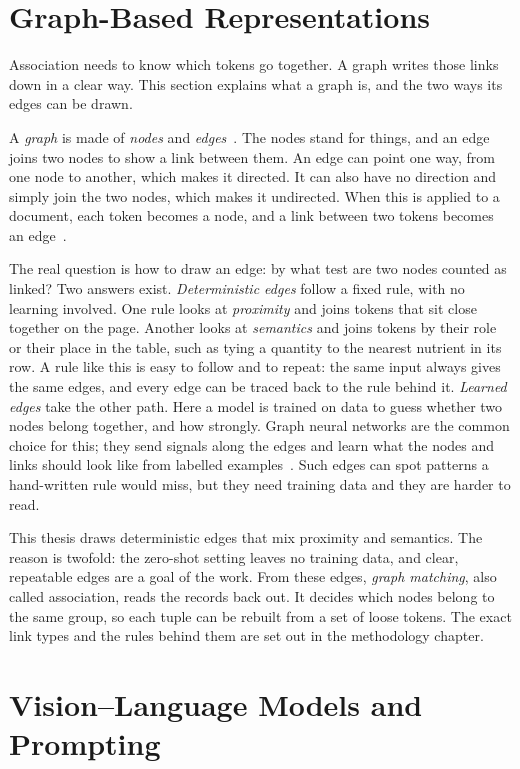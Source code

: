 \section{Graph-Based Representations}\label{sec:bgd-graphs}

Association needs to know which tokens go together. A graph writes those links
down in a clear way. This section explains what a graph is, and the two ways its
edges can be drawn.

A \emph{graph} is made of \emph{nodes} and \emph{edges}~\cite{west2001graph}. The
nodes stand for things, and an edge joins two nodes to show a link between them. An
edge can point one way, from one node to another, which makes it directed. It can
also have no direction and simply join the two nodes, which makes it undirected.
When this is applied to a document, each token becomes a node, and a link between
two tokens becomes an edge~\cite{liu2019vrd}.

The real question is how to draw an edge: by what test are two nodes counted as
linked? Two answers exist. \emph{Deterministic edges} follow a fixed rule, with no
learning involved. One rule looks at \emph{proximity} and joins tokens that sit
close together on the page. Another looks at \emph{semantics} and joins tokens by
their role or their place in the table, such as tying a quantity to the nearest
nutrient in its row. A rule like this is easy to follow and to repeat: the same
input always gives the same edges, and every edge can be traced back to the rule
behind it. \emph{Learned edges} take the other path. Here a model is trained on
data to guess whether two nodes belong together, and how strongly. Graph neural
networks are the common choice for this; they send signals along the edges and
learn what the nodes and links should look like from labelled
examples~\cite{scarselli2009gnn, kipf2017gcn}. Such edges can spot patterns a
hand-written rule would miss, but they need training data and they are harder to
read.

This thesis draws deterministic edges that mix proximity and semantics. The reason
is twofold: the zero-shot setting leaves no training data, and clear, repeatable
edges are a goal of the work. From these edges, \emph{graph matching}, also called
association, reads the records back out. It decides which nodes belong to the same
group, so each tuple can be rebuilt from a set of loose tokens. The exact link
types and the rules behind them are set out in the methodology chapter.

\section{Vision--Language Models and Prompting}\label{sec:bgd-vlm}

